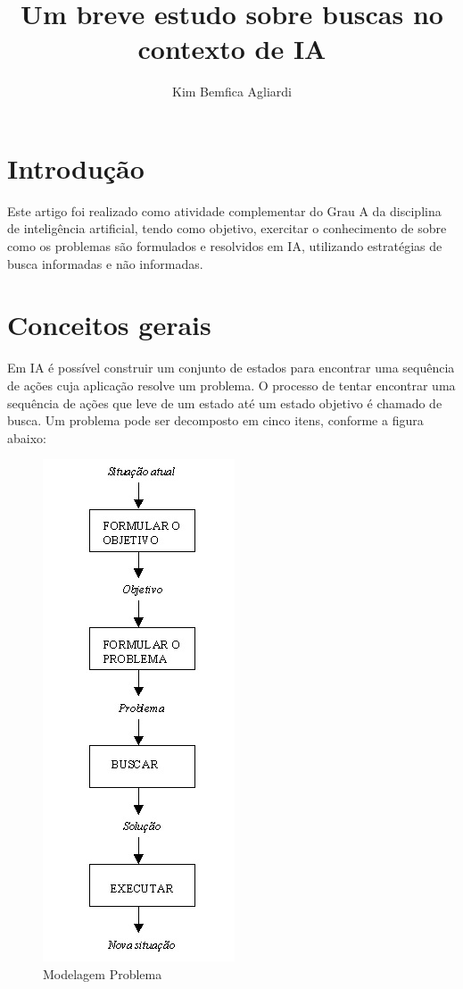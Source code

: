\documentclass[12pt]{article}
\title{Um breve estudo sobre buscas no contexto de IA }
\author{Kim Bemfica Agliardi}
\begin{document}
 

\maketitle

\section{Introdução}

Este artigo foi realizado como atividade complementar do Grau A da disciplina de inteligência artificial, tendo como objetivo, exercitar o conhecimento de sobre como os problemas são formulados e resolvidos em IA, utilizando estratégias de busca informadas e não informadas.

\section{Conceitos gerais} \label{sec:concepts}
Em IA é possível construir um conjunto de estados para encontrar uma sequência de ações cuja aplicação resolve um problema. O processo de tentar encontrar uma sequência de ações que leve de um estado até um estado objetivo é chamado de busca. 
Um problema pode ser decomposto em cinco itens, conforme a figura abaixo:

\begin{figure}[h]
    \centering
    \includegraphics[scale=.6]{figura1.jpg}
    \caption{Modelagem Problema}
    \label{fig:figura1.jpg}
\end{figure}
\end{document}
